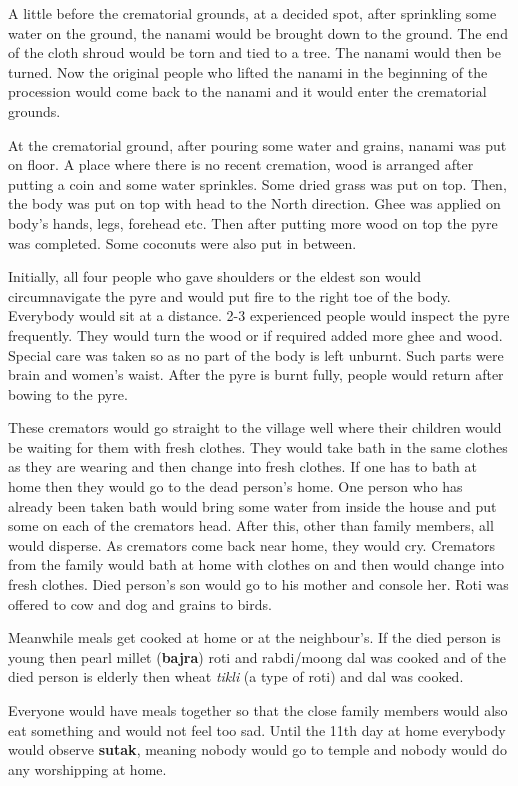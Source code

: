 A little before the crematorial grounds, at a decided spot, after sprinkling
some water on the ground, the nanami would be brought down to the ground. The
end of the cloth shroud would be torn and tied to a tree. The nanami would then
be turned. Now the original people who lifted the nanami in the beginning of the
procession would come back to the nanami and it would enter the crematorial
grounds.

At the crematorial ground, after pouring some water and grains, nanami was put
on floor. A place where there is no recent cremation, wood is arranged after
putting a coin and some water sprinkles. Some dried grass was put on top. Then,
the body was put on top with head to the North direction. Ghee was applied on
body's hands, legs, forehead etc. Then after putting more wood on top the pyre
was completed. Some coconuts were also put in between.

Initially, all four people who gave shoulders or the eldest son would
circumnavigate the pyre and would put fire to the right toe of the body.
Everybody would sit at a distance. 2-3 experienced people would inspect the
pyre frequently. They would turn the wood or if required added more ghee and
wood. Special care was taken so as no part of the body is left unburnt. Such
parts were brain and women's waist. After the pyre is burnt fully, people would
return after bowing to the pyre.

These cremators would go straight to the village well where their children
would be waiting for them with fresh clothes. They would take bath in the same
clothes as they are wearing and then change into fresh clothes. If one has to
bath at home then they would go to the dead person's home. One person who has
already been taken bath would bring some water from inside the house and put
some on each of the cremators head. After this, other than family members, all
would disperse. As cremators come back near home, they would cry. Cremators
from the family would bath at home with clothes on and then would change into
fresh clothes. Died person's son would go to his mother and console her. Roti
was offered to cow and dog and grains to birds.

Meanwhile meals get cooked at home or at the neighbour's. If the died person is
young then pearl millet (\textbf{bajra}) roti and rabdi/moong dal was cooked
and of the died person is elderly then wheat \textit{tikli} (a type of roti)
and dal was cooked.

Everyone would have meals together so that the close family members would also
eat something and would not feel too sad. Until the 11th day at home everybody
would observe \textbf{sutak}, meaning nobody would go to temple and nobody
would do any worshipping at home. 


